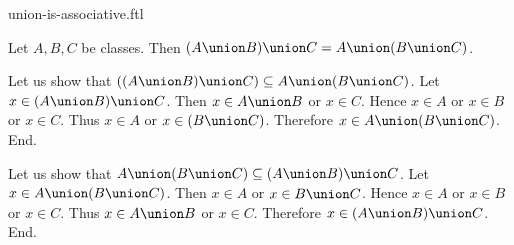 \documentclass{article}
\begin{document}
\begin{smodule}[creators={Marcel Schütz}]{union-is-associative.ftl}

  \begin{fproposition*}[label=5573070641168384]
    Let $A, B, C$ be classes.
    Then $(A \union B) \union C = A \union (B \union C)$.
  \end{fproposition*}
  \begin{fproof}
    Let us show that $((A \union B) \union C) \subseteq A \union (B \union C)$. %
      Let $x \in (A \union B) \union C$.
      Then $x \in A \union B$ or $x \in C$.
      Hence $x \in A$ or $x \in B$ or $x \in C$.
      Thus $x \in A$ or $x \in (B \union C)$.
      Therefore $x \in A \union (B \union C)$.
    End.

    Let us show that $A \union (B \union C) \subseteq (A \union B) \union C$.
      Let $x \in A \union (B \union C)$.
      Then $x \in A$ or $x \in B \union C$.
      Hence $x \in A$ or $x \in B$ or $x \in C$.
      Thus $x \in A \union B$ or $x \in C$.
      Therefore $x \in (A \union B) \union C$.
    End.
  \end{fproof}
\end{smodule}
\end{document}
